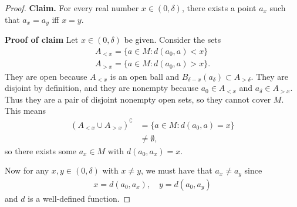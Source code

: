\documentclass[12pt,letterpaper]{article}
\begin{document}
\begin{enumerate}
\begin{enumerate}
\begin{proof}
	\textbf{Claim.} For every real number $x\in(0,\delta)$, there exists a point $a_x$ such that $a_x=a_y$ iff $x=y$. 
	
	\textbf{Proof of claim} Let $x\in(0,\delta)$ be given. Consider the sets
	\begin{align*}
	A_{<x}=\{a\in M : d(a_0,a) < x\}\\
	A_{>x}=\{a\in M : d(a_0,a) > x\}.
	\end{align*}
	They are open because $A_{<x}$ is an open ball and $B_{\delta-x}(a_\delta)\subset A_{>\delta}$. They are disjoint by definition, and they are nonempty because $a_0\in A_{<x}$ and $a_\delta\in A_{>x}$. Thus they 	are a pair of disjoint nonempty open sets, so they cannot cover $M$. This means 	
	\begin{align*}
	\left(A_{<x}\cup A_{>x}\right)^\complement&=\{a\in M : d(a_0,a) = x\} \\
	&\neq\emptyset,
	\end{align*}
	so there exists some $a_x\in M$ with $d(a_0,a_x)=x$. 
	
	Now for any $x,y\in(0,\delta)$ with $x\neq y$, we must have that $a_x\neq a_y$ since 
	\begin{align*}
	x=d(a_0,a_x), \quad
	y=d(a_0,a_y)
	\end{align*}
	and $d$ is a well-defined function. 
	\end{proof}
	\end{enumerate}
	

\end{enumerate}
\end{document}
